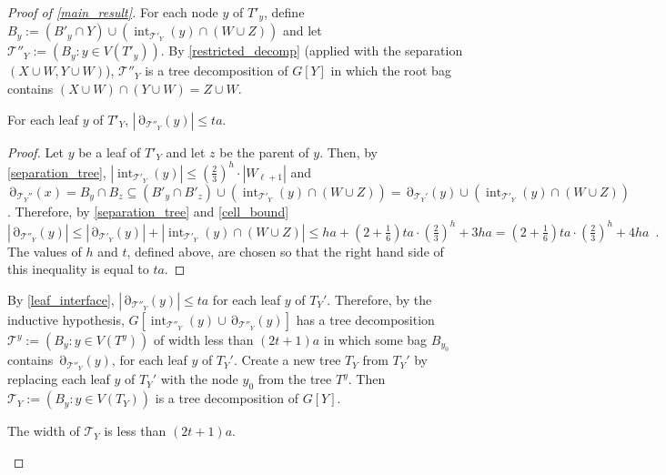 \documentclass{patmorin}
\DeclareMathOperator{\interior}{int}
\DeclareMathOperator{\boundary}{\partial}
\begin{document}
\begin{proof}[Proof of \cref{main_result}]
 For each node $y$ of $T'_y$, define $B_y:=(B'_y\cap Y) \cup (\interior_{\mathcal{T}'_Y}(y)\cap (W\cup Z))$ and let $\mathcal{T}''_Y:=(B_y:y\in V(T'_y))$.  By \cref{restricted_decomp} (applied with the separation $(X\cup W,Y\cup W)$), $\mathcal{T}''_Y$ is a tree decomposition of $G[Y]$ in which the root bag contains $(X\cup W)\cap (Y\cup W)=Z\cup W$.

 \begin{clm}\label{leaf_interface}
    For each leaf $y$ of $T'_Y$, $|\boundary_{\mathcal{T}''_Y}(y)|\le ta$.
 \end{clm}
 \begin{proof}
   Let $y$ be a leaf of $T'_Y$ and let $z$ be the parent of $y$.  Then, by \cref{separation_tree}, $|\interior_{\mathcal{T}'_Y}(y)|\le (\tfrac{2}{3})^h\cdot |W_{\ell+1}|$ and $\boundary_{\mathcal{T}_Y''}(x)=B_y\cap B_z\subseteq (B'_y\cap B'_z)\cup(\interior_{\mathcal{T}'_Y}(y)\cap (W\cup Z)) = \boundary_{\mathcal{T}_Y'}(y)\cup(\interior_{\mathcal{T}'_Y}(y)\cap (W\cup Z))$. Therefore, by \cref{separation_tree} and \cref{cell_bound}
   \[
     |\boundary_{\mathcal{T}''_Y}(y)| \le |\boundary_{\mathcal{T}'_Y}(y)| + |\interior_{\mathcal{T}'_Y}(y)\cap (W\cup Z)| \le ha + (2+\tfrac{1}{6})ta\cdot(\tfrac{2}{3})^{h} + 3ha =  (2+\tfrac{1}{6})ta\cdot(\tfrac{2}{3})^{h} + 4ha\enspace .
   \]
   The values of $h$ and $t$, defined above, are chosen so that the right hand side of this inequality is equal to $ta$.
 \end{proof}

  By \cref{leaf_interface}, $|\boundary_{\mathcal{T}''_Y}(y)|\le ta$ for each leaf $y$ of $T_Y'$. Therefore, by the inductive hypothesis, $G[\interior_{\mathcal{T}''_Y}(y)\cup\boundary_{\mathcal{T}''_Y}(y)]$ has a tree decomposition $\mathcal{T}^y:=(B_y:y\in V(T^y))$ of width less than $(2t+1)a$ in which some bag $B_{y_0}$ contains  $\boundary_{\mathcal{T}''_Y}(y)$, for each leaf $y$ of $T_Y'$. Create a new tree $T_Y$ from $T_Y'$ by replacing each leaf $y$ of $T_Y'$ with the node $y_0$ from the tree $T^y$.  Then $\mathcal{T}_Y:=(B_y:y\in V(T_Y))$ is a tree decomposition of $G[Y]$.
  \begin{clm}\label{treewidth_bound}
     The width of $\mathcal{T}_Y$ is less than $(2t+1)a$.
  \end{clm}



\end{proof}
\end{document}
